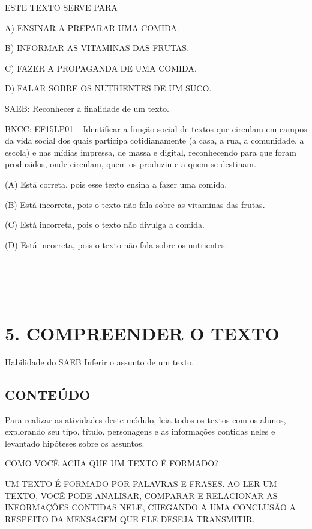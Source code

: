 ESTE TEXTO SERVE PARA

A) ENSINAR A PREPARAR UMA COMIDA.

B) INFORMAR AS VITAMINAS DAS FRUTAS.

C) FAZER A PROPAGANDA DE UMA COMIDA.

D) FALAR SOBRE OS NUTRIENTES DE UM SUCO.

SAEB: Reconhecer a finalidade de um texto.

BNCC: EF15LP01 -- Identificar a função social de textos que
circulam em campos da vida social dos quais participa cotidianamente (a
casa, a rua, a comunidade, a escola) e nas mídias impressa, de massa e
digital, reconhecendo para que foram produzidos, onde circulam, quem os
produziu e a quem se destinam.

\protect\hypertarget{_heading=h.2xcytpi}{}{}(A) Está correta, pois esse
texto ensina a fazer uma comida.

(B) Está incorreta, pois o texto não fala sobre as vitaminas das frutas.

(C) Está incorreta, pois o texto não divulga a comida.

(D) Está incorreta, pois o texto não fala sobre os nutrientes.

\section{\texorpdfstring{\\
}{ }}\label{section-15}

\section{5. COMPREENDER O
TEXTO}\label{muxf3dulo-5-compreender-o-texto}

\protect\hypertarget{_heading=h.3whwml4}{}{}Habilidade do SAEB
Inferir o assunto de um texto.

\subsection{CONTEÚDO}\label{conteuxfado-4}

Para realizar as atividades deste módulo, leia todos os textos com os alunos, explorando seu tipo, título, personagens e as informações contidas neles e levantado hipóteses sobre os assuntos.

COMO VOCÊ ACHA QUE UM TEXTO É FORMADO?

UM TEXTO É FORMADO POR PALAVRAS E FRASES. AO LER UM TEXTO, VOCÊ PODE ANALISAR, COMPARAR E RELACIONAR AS INFORMAÇÕES CONTIDAS NELE, CHEGANDO A UMA CONCLUSÃO A RESPEITO DA MENSAGEM QUE ELE DESEJA TRANSMITIR.

